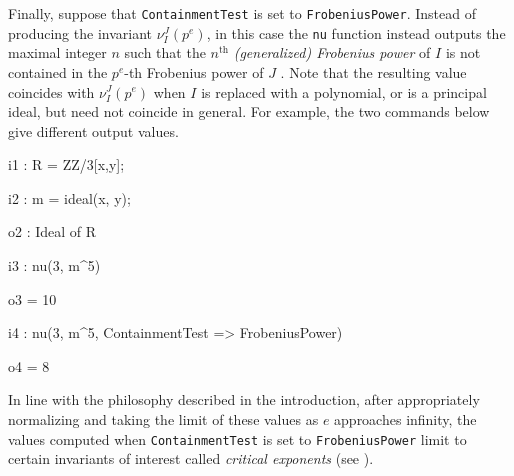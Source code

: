 \documentclass{amsart}
\begin{document}
Finally, suppose that {\tt ContainmentTest} is set to {\tt FrobeniusPower}.  Instead of producing the invariant $\nu_I^J(p^e)$, in this case the {\tt nu} function instead outputs the maximal integer $n$ such that the $n^{\textrm{th}}$ \emph{(generalized) Frobenius power} of $I$ is not contained in the $p^e$-th Frobenius power of $J$ \cite{hernandez+etal.frobenius_powers}. 
Note that the resulting value coincides with $\nu_I^J(p^e)$ when $I$ is replaced with a polynomial, or is a principal ideal, but need not coincide in general. 
For example, the two commands below give different output values. 
{\small
{}
\begin{MyVerbatim}

i1 : R = ZZ/3[x,y];

i2 : m = ideal(x, y);

o2 : Ideal of R

i3 : nu(3, m^5)

o3 = 10

i4 : nu(3, m^5, ContainmentTest => FrobeniusPower)

o4 = 8
\end{MyVerbatim}
}
\medspace
\noindent In line with the philosophy described in the introduction, after appropriately normalizing and taking the limit of these values as $e$ approaches infinity, the values computed when {\tt ContainmentTest} is set to {\tt FrobeniusPower}
limit to certain invariants of interest called \emph{critical exponents} (see \cite{hernandez+etal.frobenius_powers}). 








\end{document}
